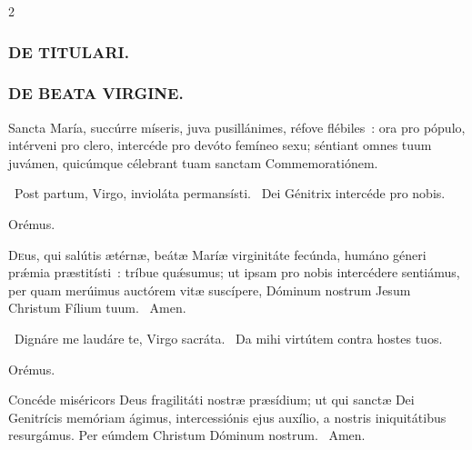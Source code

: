 \documentclass[9pt,twoside]{extarticle}
\begin{document}
\begin{multicols}{2}
{\subsubsection*{\center \textsc{DE TITULARI.}}

\subsubsection*{\center \textsc{DE BEATA VIRGINE.}}
\begin{tightlist}{}
\item {}
\item {} Sancta María, succúrre míseris, juva pusillánimes, réfove flébiles~: ora pro pópulo, intérveni pro clero, intercéde pro devóto femíneo sexu; séntiant omnes tuum juvámen, quicúmque célebrant tuam sanctam Commemoratiónem.
\item {}
\item {}~Post partum, Virgo, invioláta permansísti. ~Dei Génitrix intercéde pro nobis.
\item Orémus. \hfill {}
\end{tightlist}
\lettrine{D}eus, qui salútis ætérnæ, beátæ Maríæ virginitáte fecúnda, humáno géneri prǽmia præstitísti~: tríbue quǽsumus; ut ipsam pro nobis intercédere sentiámus, per quam merúimus auctórem vitæ suscípere, Dóminum nostrum Jesum Christum Fílium tuum. ~Amen.

\begin{tightlist}{}
\item {}
\item {}~Dignáre me laudáre te, Virgo sacráta. ~Da mihi virtútem contra hostes tuos.
\item Orémus. \hfill {}
\end{tightlist}
\lettrine{C}oncéde miséricors Deus fragilitáti nostræ præsídium; ut qui sanctæ Dei Genitrícis memóriam ágimus, intercessiónis ejus auxílio, a nostris iniquitátibus resurgámus. Per eúmdem Christum Dóminum nostrum. ~Amen.

}
\end{multicols}
\end{document}
